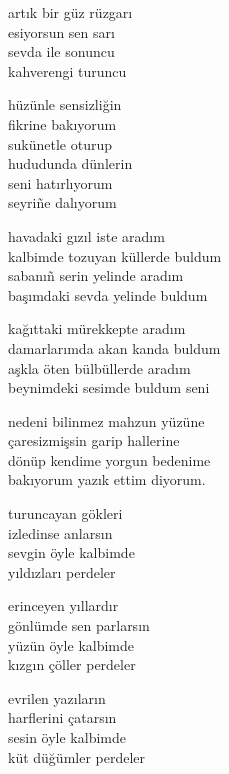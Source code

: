 \documentclass[10pt, openright, oneside]{memoir}
\theoremstyle{definition}
\begin{document}
\vspace*{\fill}
%
\newpage
{}
\vspace*{\fill}
\settowidth{\versewidth}{artık bir güz rüzgarı}
\begin{cverse}
  artık bir güz rüzgarı \\
  esiyorsun sen sarı \\
  sevda ile sonuncu \\
  kahverengi turuncu

  hüzünle sensizliğin \\
  fikrine bakıyorum \\
  sukünetle oturup \\
  hududunda dünlerin \\
  seni hatırlıyorum \\
  seyri\~ne dalıyorum
\end{cverse}
\vspace*{\fill}
%
\newpage
{}
\vspace*{\fill}
\settowidth{\versewidth}{kalbimde tozuyan küllerde buldum}
\begin{cverse}
  havadaki gızıl iste aradım \\
  kalbimde tozuyan küllerde buldum \\
  sabanı\~n serin yelinde aradım \\
  başımdaki sevda yelinde buldum

  kağıttaki mürekkepte aradım \\
  damarlarımda akan kanda buldum \\
  aşkla öten bülbüllerde aradım \\
  beynimdeki sesimde buldum seni

  nedeni bilinmez mahzun yüzüne \\
  çaresizmişsin garip hallerine \\
  dönüp kendime yorgun bedenime \\
  bakıyorum yazık ettim diyorum.
\end{cverse}
\vspace*{\fill}
%
\newpage
{}
\vspace*{\fill}
\settowidth{\versewidth}{gönlümde sen parlarsın}
\begin{cverse}
  turuncayan gökleri \\
  izledinse anlarsın \\
  sevgin öyle kalbimde \\
  yıldızları perdeler

  erinceyen yıllardır \\
  gönlümde sen parlarsın \\
  yüzün öyle kalbimde \\
  kızgın çöller perdeler

  evrilen yazıların \\
  harflerini çatarsın \\
  sesin öyle kalbimde \\
  küt düğümler perdeler
\end{cverse}
\end{document}
